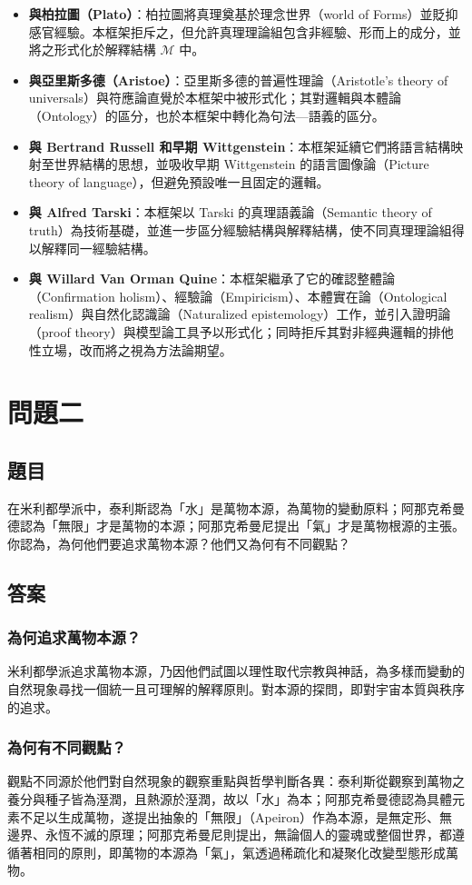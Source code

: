 \documentclass[a4paper,12pt]{article}
\begin{document}
\begin{itemize}
\item \textbf{與柏拉圖（Plato）}：柏拉圖將真理奠基於理念世界（world of Forms）並貶抑感官經驗。本框架拒斥之，但允許真理理論組包含非經驗、形而上的成分，並將之形式化於解釋結構 $\mathcal{M}$ 中。
\item \textbf{與亞里斯多德（Aristoe）}：亞里斯多德的普遍性理論（Aristotle's theory of universals）與符應論直覺於本框架中被形式化；其對邏輯與本體論（Ontology）的區分，也於本框架中轉化為句法—語義的區分。
\item \textbf{與 Bertrand Russell 和早期 Wittgenstein}：本框架延續它們將語言結構映射至世界結構的思想，並吸收早期 Wittgenstein 的語言圖像論（Picture theory of language），但避免預設唯一且固定的邏輯。
\item \textbf{與 Alfred Tarski}：本框架以 Tarski 的真理語義論（Semantic theory of truth）為技術基礎，並進一步區分經驗結構與解釋結構，使不同真理理論組得以解釋同一經驗結構。
\item \textbf{與 Willard Van Orman Quine}：本框架繼承了它的確認整體論（Confirmation holism）、經驗論（Empiricism）、本體實在論（Ontological realism）與自然化認識論（Naturalized epistemology）工作，並引入證明論（proof theory）與模型論工具予以形式化；同時拒斥其對非經典邏輯的排他性立場，改而將之視為方法論期望。
\end{itemize}
\section{問題二}
\subsection{題目}
在米利都學派中，泰利斯認為「水」是萬物本源，為萬物的變動原料；阿那克希曼德認為「無限」才是萬物的本源；阿那克希曼尼提出「氣」才是萬物根源的主張。你認為，為何他們要追求萬物本源？他們又為何有不同觀點？
\subsection{答案}
\subsubsection{為何追求萬物本源？}
米利都學派追求萬物本源，乃因他們試圖以理性取代宗教與神話，為多樣而變動的自然現象尋找一個統一且可理解的解釋原則。對本源的探問，即對宇宙本質與秩序的追求。
\subsubsection{為何有不同觀點？}
觀點不同源於他們對自然現象的觀察重點與哲學判斷各異：泰利斯從觀察到萬物之養分與種子皆為溼潤，且熱源於溼潤，故以「水」為本；阿那克希曼德認為具體元素不足以生成萬物，遂提出抽象的「無限」（Apeiron）作為本源，是無定形、無邊界、永恆不滅的原理；阿那克希曼尼則提出，無論個人的靈魂或整個世界，都遵循著相同的原則，即萬物的本源為「氣」，氣透過稀疏化和凝聚化改變型態形成萬物。
\end{document}
